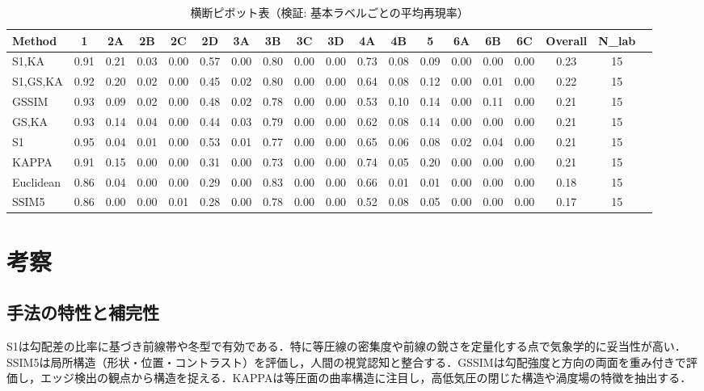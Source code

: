 \documentclass{jarticle}
\theoremstyle{definition}
\begin{document}
\begin{table*}[t!]
\centering
\caption{横断ピボット表（検証: 基本ラベルごとの平均再現率）}
\label{tab:pivot_valid}
\scriptsize
\setlength{\tabcolsep}{3pt}
\begin{tabular}{lcccccccccccccccccc}
\hline
Method & 1 & 2A & 2B & 2C & 2D & 3A & 3B & 3C & 3D & 4A & 4B & 5 & 6A & 6B & 6C & Overall & N\_lab \\
\hline
S1,KA      & 0.91 & 0.21 & 0.03 & 0.00 & 0.57 & 0.00 & 0.80 & 0.00 & 0.00 & 0.73 & 0.08 & 0.09 & 0.00 & 0.00 & 0.00 & 0.23 & 15 \\
S1,GS,KA   & 0.92 & 0.20 & 0.02 & 0.00 & 0.45 & 0.02 & 0.80 & 0.00 & 0.00 & 0.64 & 0.08 & 0.12 & 0.00 & 0.01 & 0.00 & 0.22 & 15 \\
GSSIM      & 0.93 & 0.09 & 0.02 & 0.00 & 0.48 & 0.02 & 0.78 & 0.00 & 0.00 & 0.53 & 0.10 & 0.14 & 0.00 & 0.11 & 0.00 & 0.21 & 15 \\
GS,KA      & 0.93 & 0.14 & 0.04 & 0.00 & 0.44 & 0.03 & 0.79 & 0.00 & 0.00 & 0.62 & 0.08 & 0.14 & 0.00 & 0.00 & 0.00 & 0.21 & 15 \\
S1         & 0.95 & 0.04 & 0.01 & 0.00 & 0.53 & 0.01 & 0.77 & 0.00 & 0.00 & 0.65 & 0.06 & 0.08 & 0.02 & 0.04 & 0.00 & 0.21 & 15 \\
KAPPA      & 0.91 & 0.15 & 0.00 & 0.00 & 0.31 & 0.00 & 0.73 & 0.00 & 0.00 & 0.74 & 0.05 & 0.20 & 0.00 & 0.00 & 0.00 & 0.21 & 15 \\
Euclidean  & 0.86 & 0.04 & 0.00 & 0.00 & 0.29 & 0.00 & 0.83 & 0.00 & 0.00 & 0.66 & 0.01 & 0.01 & 0.00 & 0.00 & 0.00 & 0.18 & 15 \\
SSIM5      & 0.86 & 0.00 & 0.00 & 0.01 & 0.28 & 0.00 & 0.78 & 0.00 & 0.00 & 0.52 & 0.08 & 0.05 & 0.00 & 0.00 & 0.00 & 0.17 & 15 \\
\hline
\end{tabular}
\end{table*}

\section{考察}
\subsection{手法の特性と補完性}
S1は勾配差の比率に基づき前線帯や冬型で有効である．特に等圧線の密集度や前線の鋭さを定量化する点で気象学的に妥当性が高い．SSIM5は局所構造（形状・位置・コントラスト）を評価し，人間の視覚認知と整合する．GSSIMは勾配強度と方向の両面を重み付きで評価し，エッジ検出の観点から構造を捉える．KAPPAは等圧面の曲率構造に注目し，高低気圧の閉じた構造や渦度場の特徴を抽出する．
\end{document}
